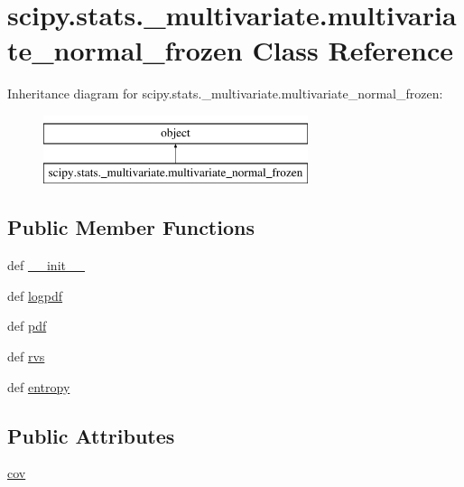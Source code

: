\hypertarget{classscipy_1_1stats_1_1__multivariate_1_1multivariate__normal__frozen}{}\section{scipy.\+stats.\+\_\+multivariate.\+multivariate\+\_\+normal\+\_\+frozen Class Reference}
\label{classscipy_1_1stats_1_1__multivariate_1_1multivariate__normal__frozen}
Inheritance diagram for scipy.\+stats.\+\_\+multivariate.\+multivariate\+\_\+normal\+\_\+frozen\+:\begin{figure}[H]
\begin{center}
\leavevmode
\includegraphics[height=2.000000cm]{classscipy_1_1stats_1_1__multivariate_1_1multivariate__normal__frozen}
\end{center}
\end{figure}
\subsection*{Public Member Functions}
\begin{DoxyCompactItemize}
\item 
def \hyperlink{classscipy_1_1stats_1_1__multivariate_1_1multivariate__normal__frozen_a606849d0b8cdfed8d798f7505085e5ee}{\+\_\+\+\_\+init\+\_\+\+\_\+}
\item 
def \hyperlink{classscipy_1_1stats_1_1__multivariate_1_1multivariate__normal__frozen_aa8987bf808468f98046a8455d48e9230}{logpdf}
\item 
def \hyperlink{classscipy_1_1stats_1_1__multivariate_1_1multivariate__normal__frozen_a995d84ec2f742e397d35d9f67180347c}{pdf}
\item 
def \hyperlink{classscipy_1_1stats_1_1__multivariate_1_1multivariate__normal__frozen_aa4c23c6a85c38860416ad51801270733}{rvs}
\item 
def \hyperlink{classscipy_1_1stats_1_1__multivariate_1_1multivariate__normal__frozen_a38ec76034dc0f44383a3e324ed024f51}{entropy}
\end{DoxyCompactItemize}
\subsection*{Public Attributes}
\begin{DoxyCompactItemize}
\item 
\hyperlink{classscipy_1_1stats_1_1__multivariate_1_1multivariate__normal__frozen_a8762a22eb6adc24c9df226c207e94cd6}{cov}
\end{DoxyCompactItemize}


